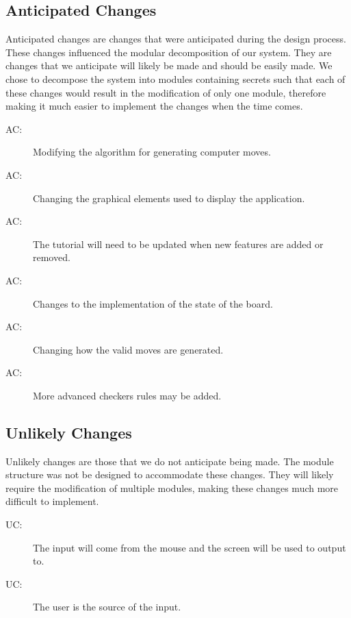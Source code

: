 \documentclass[12pt, titlepage]{article}
\newcounter{acnum}
\newcommand{\actheacnum}{AC\theacnum}
\newcounter{ucnum}
\newcommand{\uctheucnum}{UC\theucnum}
\begin{document}
\subsection{Anticipated Changes} \label{SecAchange}

Anticipated changes are changes that were anticipated during the design process. These changes influenced the modular decomposition of our system. They are changes that we anticipate will likely be made and should be easily made. We chose to decompose the system into modules containing secrets such that each of these changes would result in the modification of only one module, therefore making it much easier to implement the changes when the time comes. 

\begin{description}
\item[ \actheacnum \label{acAlgorithm}:] Modifying the algorithm for generating computer moves.
\item[ \actheacnum \label{acGraphics}:] Changing the graphical elements used to display the application.
\item[ \actheacnum \label{acMenu}:] The tutorial will need to be updated when new features are added or removed.
\item[ \actheacnum \label{acBoard}:] Changes to the implementation of the state of the board.
\item[ \actheacnum \label{acMoves}:] Changing how the valid moves are generated.
\item[ \actheacnum \label{acRules}:] More advanced checkers rules may be added.
\end{description}

\subsection{Unlikely Changes} \label{SecUchange}

Unlikely changes are those that we do not anticipate being made. The module structure was not be designed to accommodate these changes. They will likely require the modification of multiple modules, making these changes much more difficult to implement.


\begin{description}
\item[ \uctheucnum \label{ucIO}:] The input will come from the mouse and the screen will be used to output to. 
\item[ \uctheucnum \label{ucInput}:] The user is the source of the input.
\end{description}
\end{document}
